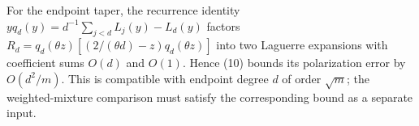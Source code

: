 \documentclass[11pt]{article}
\begin{document}
For the endpoint taper, the recurrence identity
$yq_d(y)=d^{-1}\sum_{j<d}L_j(y)-L_d(y)$ factors
$R_d=q_d(\theta z)[(2/(\theta d)-z)q_d(\theta z)]$ into two Laguerre
expansions with coefficient sums $O(d)$ and $O(1)$.
Hence (10) bounds its polarization error by $O(d^2/m)$.
This is compatible with endpoint degree $d$ of order $\sqrt m$;
the weighted-mixture comparison must satisfy the corresponding bound
as a separate input.
\end{document}
